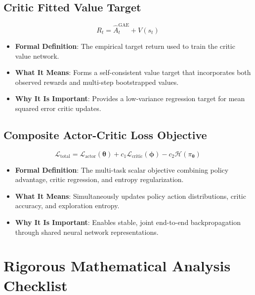 \documentclass[11pt,a4paper]{article}
\theoremstyle{definition}
\begin{document}
\subsection{Critic Fitted Value Target}
{\boldmath
\begin{equation}
R_t = \widehat{A}_t^{\text{GAE}} + V(s_t)
\end{equation}
}
\begin{itemize}
    \item \textbf{Formal Definition}: The empirical target return used to train the critic value network.
    \item \textbf{What It Means}: Forms a self-consistent value target that incorporates both observed rewards and multi-step bootstrapped values.
    \item \textbf{Why It Is Important}: Provides a low-variance regression target for mean squared error critic updates.
\end{itemize}

\subsection{Composite Actor-Critic Loss Objective}
{\boldmath
\begin{equation}
\mathcal{L}_{\text{total}} = \mathcal{L}_{\text{actor}}(\boldsymbol{\theta}) + c_1 \mathcal{L}_{\text{critic}}(\boldsymbol{\phi}) - c_2 \mathcal{H}(\pi_{\boldsymbol{\theta}})
\end{equation}
}
\begin{itemize}
    \item \textbf{Formal Definition}: The multi-task scalar objective combining policy advantage, critic regression, and entropy regularization.
    \item \textbf{What It Means}: Simultaneously updates policy action distributions, critic accuracy, and exploration entropy.
    \item \textbf{Why It Is Important}: Enables stable, joint end-to-end backpropagation through shared neural network representations.
\end{itemize}

\section{Rigorous Mathematical Analysis Checklist}
\end{document}
